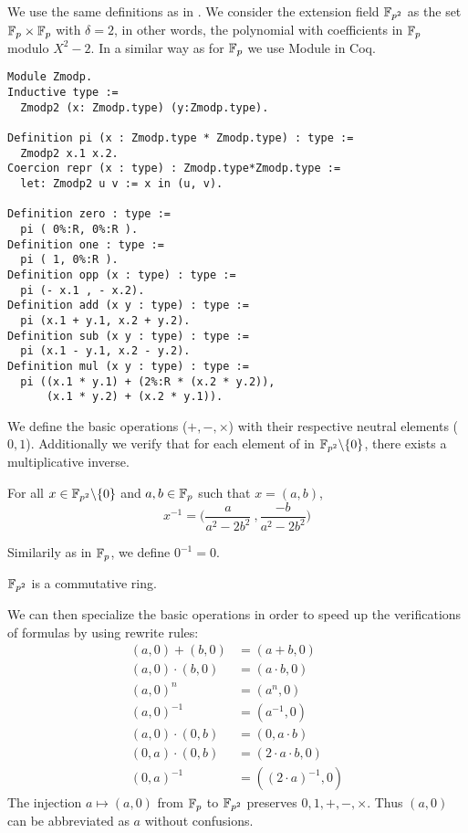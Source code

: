 We use the same definitions as in \cite{Ber06}. We consider the extension field $\mathbb{F}_{p^2}$ as the set $\mathbb{F}_{p} \times \mathbb{F}_{p}$ with $\delta = 2$, in other words,
the polynomial with coefficients in $\mathbb{F}_{p}$ modulo $X^2 - 2$. In a similar way as for $\mathbb{F}_{p}$ we use Module in Coq.
\begin{lstlisting}[language=Coq]
Module Zmodp.
Inductive type :=
  Zmodp2 (x: Zmodp.type) (y:Zmodp.type).

Definition pi (x : Zmodp.type * Zmodp.type) : type :=
  Zmodp2 x.1 x.2.
Coercion repr (x : type) : Zmodp.type*Zmodp.type :=
  let: Zmodp2 u v := x in (u, v).

Definition zero : type :=
  pi ( 0%:R, 0%:R ).
Definition one : type :=
  pi ( 1, 0%:R ).
Definition opp (x : type) : type :=
  pi (- x.1 , - x.2).
Definition add (x y : type) : type :=
  pi (x.1 + y.1, x.2 + y.2).
Definition sub (x y : type) : type :=
  pi (x.1 - y.1, x.2 - y.2).
Definition mul (x y : type) : type :=
  pi ((x.1 * y.1) + (2%:R * (x.2 * y.2)),
      (x.1 * y.2) + (x.2 * y.1)).
\end{lstlisting}
We define the basic operations ($+, -, \times$) with their respective neutral elements ($0, 1$).
Additionally we verify that for each element of in $\mathbb{F}_{p^2}\backslash\{0\}$, there exists a multiplicative inverse.
\begin{lemma} For all $x \in \mathbb{F}_{p^2}\backslash\{0\}$ and $a,b \in \mathbb{F}_{p}$ such that $x = (a,b)$,
$$x^{-1} = \Big(\frac{a}{a^2-2b^2}\ , \frac{-b}{a^2-2b^2}\Big)$$
\end{lemma}
Similarily as in $\mathbb{F}_{p}$, we define $0^{-1} = 0$.
\begin{lemma}
$\mathbb{F}_{p^2}$ is a commutative ring.
\end{lemma}
We can then specialize the basic operations in order to speed up the verifications of formulas by using rewrite rules:
\begin{align*}
(a,0) + (b,0) &= (a+b, 0)\\
(a,0) \cdot   (b,0) &= (a \cdot b, 0)\\
(a, 0)^n &= (a^n, 0)\\
(a, 0)^{-1} &= (a^{-1}, 0)\\
(a, 0)\cdot (0,b) &= (0, a\cdot b)\\
(0, a)\cdot (0,b) &= (2\cdot a\cdot b, 0)\\
(0,a)^{-1} &= ((2\cdot a)^{-1},0)
\end{align*}
The injection $a \mapsto (a,0)$ from $\mathbb{F}_{p}$ to $\mathbb{F}_{p^2}$ preserves $0, 1, +, -, \times$. Thus $(a,0)$ can be abbreviated as $a$ without confusions.


